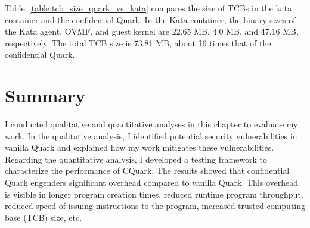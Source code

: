 Table~\ref{table:tcb_size_quark_vs_kata} compares the size of TCBs in the kata container and the confidential Quark. In the Kata container, the binary sizes of the Kata agent, OVMF, and guest kernel are 22.65 MB, 4.0 MB, and 47.16 MB, respectively. The total TCB size is 73.81 MB, about 16 times that of the confidential 
Quark.

\section{Summary}
I conducted qualitative and quantitative analyses in this chapter to evaluate my work. In the qualitative analysis, I identified potential security vulnerabilities in vanilla Quark and explained how my work mitigates these vulnerabilities. 
Regarding the quantitative analysis, I developed a testing framework to characterize the performance of CQuark. The results showed that confidential Quark engenders significant overhead compared to vanilla Quark. 
This overhead is visible in longer program creation times, reduced runtime program throughput, reduced speed of issuing instructions to the program, increased trusted computing base (TCB) size, etc.










\cleardoublepage

